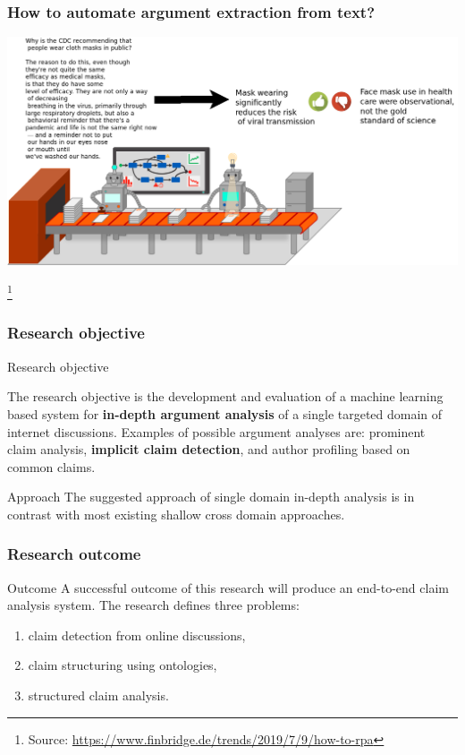 \documentclass{beamer}
\begin{document}
\begin{frame}
\frametitle{How to automate argument extraction from text?}
\begin{center}
\includegraphics[scale=0.22]{assembly_line_text.png}
\end{center}
\footnote{
\tiny{Source: \url{https://www.finbridge.de/trends/2019/7/9/how-to-rpa}}}
\end{frame}

\begin{frame}
	\frametitle{Research objective}
	\begin{block}{Research objective}
		
The research objective is the development and evaluation of a machine learning
based system for \textbf{in-depth argument analysis} of a single targeted domain of
internet discussions. Examples of possible argument analyses are: prominent
claim analysis, \textbf{implicit claim detection}, and author profiling based on common claims. 
\end{block}

\begin{block}{Approach}
The suggested approach of single domain in-depth analysis is in contrast
with most existing shallow cross domain approaches. 
\end{block}

\end{frame}


\begin{frame}

	\frametitle{Research outcome}

\begin{block}{Outcome}
A successful outcome of this research will produce an end-to-end claim analysis
system. The research defines three problems: 
\begin{enumerate}
	\item claim detection from online discussions, 
	\item claim structuring using ontologies, 
	\item structured claim analysis.  
\end{enumerate}
\end{block}

\end{frame}
\end{document}

